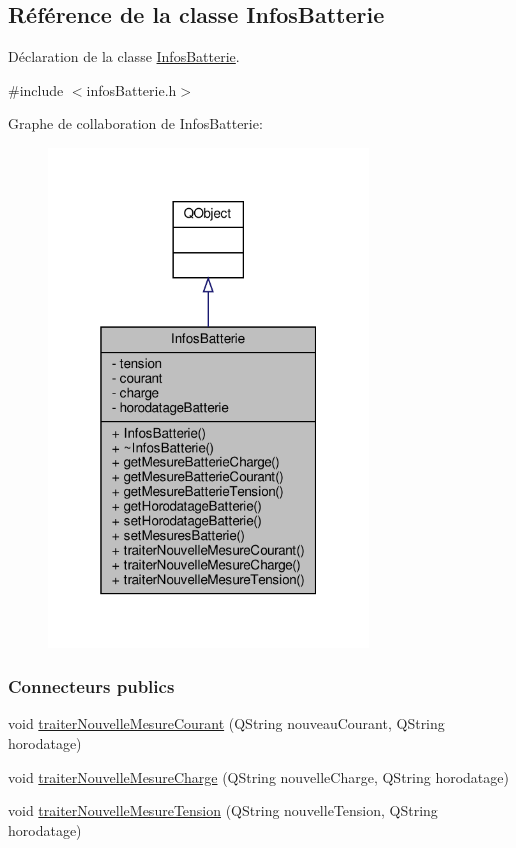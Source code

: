 \hypertarget{class_infos_batterie}{}\subsection{Référence de la classe Infos\+Batterie}
\label{class_infos_batterie}


Déclaration de la classe \hyperlink{class_infos_batterie}{Infos\+Batterie}.  




{\ttfamily \#include $<$infos\+Batterie.\+h$>$}



Graphe de collaboration de Infos\+Batterie\+:\nopagebreak
\begin{figure}[H]
\begin{center}
\leavevmode
\includegraphics[width=241pt]{class_infos_batterie__coll__graph}
\end{center}
\end{figure}
\subsubsection*{Connecteurs publics}
\begin{DoxyCompactItemize}
\item 
void \hyperlink{class_infos_batterie_a7c127f1798ba279918b7b0783f9d23c4}{traiter\+Nouvelle\+Mesure\+Courant} (Q\+String nouveau\+Courant, Q\+String horodatage)
\item 
void \hyperlink{class_infos_batterie_a92c1afb1e022fe75cd7a0877d64e8d53}{traiter\+Nouvelle\+Mesure\+Charge} (Q\+String nouvelle\+Charge, Q\+String horodatage)
\item 
void \hyperlink{class_infos_batterie_a8b1c1008d441b30f2cf38995fae3e0ca}{traiter\+Nouvelle\+Mesure\+Tension} (Q\+String nouvelle\+Tension, Q\+String horodatage)
\end{DoxyCompactItemize}
